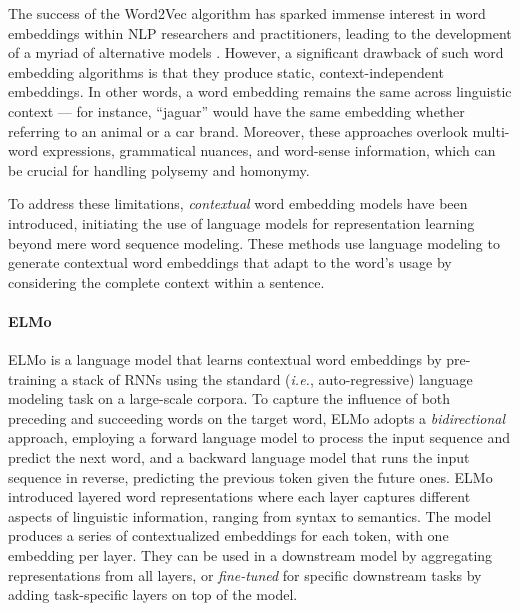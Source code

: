
The success of the Word2Vec algorithm \citep{mikolov2013efficient} has sparked immense interest in word embeddings within \ac{NLP} researchers and practitioners, leading to the development of a myriad of alternative models \citep{pennington2014glove, shazeer2016swivel, bojanowski2017enriching}. However, a significant drawback of such word embedding algorithms is that they produce static, context-independent embeddings. In other words, a word embedding remains the same across linguistic context — for instance, “jaguar” would have the same embedding whether referring to an animal or a car brand. Moreover, these approaches overlook multi-word expressions, grammatical nuances, and word-sense information, which can be crucial for handling polysemy and homonymy.

To address these limitations, \textit{contextual} word embedding models have been introduced, initiating the use of language models for representation learning beyond mere word sequence modeling. These methods use language modeling to generate contextual word embeddings that adapt to the word's usage by considering the complete context within a sentence. 

\paragraph{ELMo} \ac{ELMo} \citep{peters-etal-2018-deep} is a language model that learns contextual word embeddings by pre-training a stack of \acp{RNN} using the standard (\textit{i.e.}, auto-regressive) language modeling task on a large-scale corpora. To capture the influence of both preceding and succeeding words on the target word, \ac{ELMo} adopts a \textit{bidirectional} approach, employing a forward language model to process the input sequence and predict the next word, and a backward language model that runs the input sequence in reverse, predicting the previous token given the future ones. \ac{ELMo} introduced layered word representations where each layer captures different aspects of linguistic information, ranging from syntax to semantics. The model produces a series of contextualized embeddings for each token, with one embedding per layer. They can be used in a downstream model by aggregating representations from all layers, or \textit{fine-tuned} for specific downstream tasks by adding task-specific layers on top of the model.

